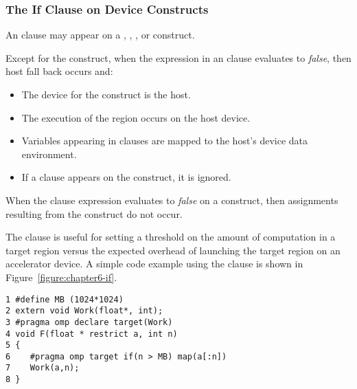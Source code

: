 \subsubsection{The If Clause on Device Constructs}
\label{ssec:06.if-clause}

An  clause
may appear on a , , ,
 or  construct.  

Except for the  construct, when the expression in an
 clause evaluates to \emph{false}, then host fall back occurs and: 
\begin{itemize} 
\item The device for the construct is the host.  
\item The execution of the region occurs on the host device.
\item Variables appearing in  clauses are mapped to the host's device data environment.
\item If a  clause appears on the construct, it is ignored. 
\end{itemize}

When the  clause expression evaluates to \emph{false} on a
 construct, then assignments resulting from the construct
do not occur.

The 
clause is useful for setting a threshold on the amount of computation in a
target region versus the expected overhead of launching the target region on an
accelerator device.  A simple code example using the  clause is shown
in Figure~\ref{figure:chapter6-if}.

\begin{figure*}[!tb]
\begin{verbatim}
1 #define MB (1024*1024)
2 extern void Work(float*, int);
3 #pragma omp declare target(Work)
4 void F(float * restrict a, int n)
5 {
6    #pragma omp target if(n > MB) map(a[:n])
7    Work(a,n);
8 }
\end{verbatim}
\caption{ \textbf {Example of an if clause on the target construct} -- \small
          If \texttt{n} is greater than a threshold, execute the target region on the
          default accelerator.  Otherwise, execute the region on the host device.
         }
\label{figure:chapter6-if}
\end{figure*}

